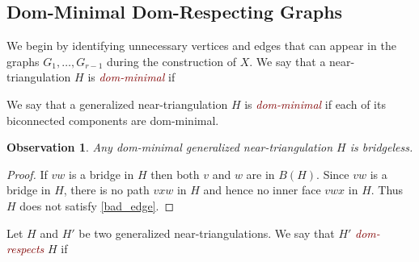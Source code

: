 \documentclass{article}
\newtheorem{obs}{Observation}
\newcommand{\defin}[1]{\emph{\textcolor{Maroon}{#1}}}
\theoremstyle{definition}
\begin{document}


\subsection{Dom-Minimal Dom-Respecting Graphs}

We begin by identifying unnecessary vertices and edges that can appear in the graphs $G_1,\ldots,G_{r-1}$ during the construction of $X$.   We say that a near-triangulation $H$ is \defin{dom-minimal} if
We say that a generalized near-triangulation $H$ is \defin{dom-minimal} if each of its biconnected components are dom-minimal.

\begin{obs}\label{bridgeless}
    Any dom-minimal generalized near-triangulation $H$ is bridgeless.
\end{obs}

\begin{proof}
   If $vw$ is a bridge in $H$ then both $v$ and $w$ are in $B(H)$.  Since $vw$ is a bridge in $H$, there is no path $vxw$ in $H$ and hence no inner face $vwx$ in $H$. Thus $H$ does not satisfy \cref{bad_edge}.
\end{proof}

Let $H$ and $H'$ be two generalized near-triangulations.  We say that $H'$ \defin{dom-respects} $H$ if
\end{document}
